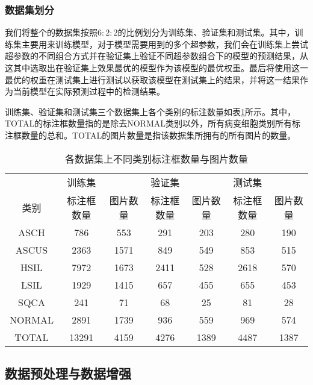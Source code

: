 \subsubsection{数据集划分}
\par 我们将整个的数据集按照$6:2:2$的比例划分为训练集、验证集和测试集。其中，训练集主要用来训练模型，对于模型需要用到的多个超参数，我们会在训练集上尝试超参数的不同组合方式并在验证集上验证不同超参数组合下的模型的预测结果，从这其中选取出在验证集上效果最优的模型作为该模型的最优权重。最后将使用这一最优的权重在测试集上进行测试以获取该模型在测试集上的结果，并将这一结果作为当前模型在实际预测过程中的检测结果。
\par 训练集、验证集和测试集三个数据集上各个类别的标注数量如表\ref{tab:各数据集类别}所示。其中，TOTAL的标注框数量指的是除去NORMAL类别以外，所有病变细胞类别所有标注框数量的总和。TOTAL的图片数量是指该数据集所拥有的所有图片的数量。

\begin{table}[htbp]
    \center
    \caption{各数据集上不同类别标注框数量与图片数量}
    \begin{tabular}{ccccccc}
        \hline
               & 训练集     &          & 验证集     &          & 测试集     &          \\
        类别   & 标注框数量 & 图片数量 & 标注框数量 & 图片数量 & 标注框数量 & 图片数量 \\
        \hline
        ASCH   & 786        & 553      & 291        & 203      & 280        & 190      \\
        ASCUS  & 2363       & 1571     & 849        & 549      & 853        & 515      \\
        HSIL   & 7972       & 1673     & 2411       & 528      & 2618       & 570      \\
        LSIL   & 1929       & 1415     & 657        & 455      & 655        & 453      \\
        SQCA   & 241        & 71       & 68         & 25       & 81         & 28       \\
        NORMAL & 2891       & 1739     & 936        & 559      & 969        & 574      \\
        TOTAL  & 13291      & 4159     & 4276       & 1389     & 4487       & 1387     \\
        \hline
    \end{tabular}
    \label{tab:各数据集类别}
\end{table}

\subsection{数据预处理与数据增强}
